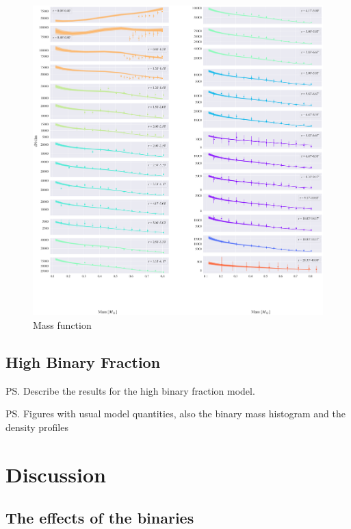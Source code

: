 \begin{figure}
	\begin{center}
		\includegraphics[width=\textwidth]{figures/low_bin_model/mass_fun.png}
	\end{center}
	\caption{Mass function}
	\label{fig:low_bin_model_mass_fun}
\end{figure}








\subsection{High Binary Fraction}
\ps{Describe the results for the high binary fraction model.}

\ps{Figures with usual model quantities, also the binary mass histogram and the density profiles}







\section{Discussion}

\subsection{The effects of the binaries}

